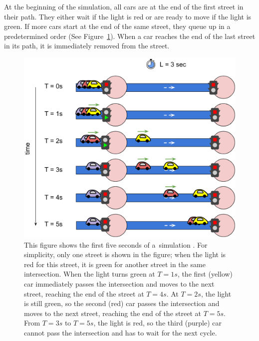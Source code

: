 At the beginning of the simulation, all cars are at the end of the first street in their path. They either wait if the light is red or are ready to move if the light is green. If more cars start at the end of the same street, they queue up in a predetermined order (See Figure~\ref{fig:hashcode_street}). When a car reaches the end of the last street in its path, it is immediately removed from the street.

\begin{figure}[ht] %
    \centering
    \includegraphics[width=\linewidth]{img/hashcode/figure3.png}
    \caption[Example of cars driving through a street]{
        This figure shows the first five seconds of a~simulation \cite{google_coding_competitions}.
        For simplicity, only one street is shown in the figure; when the light is red for this street, it is green for another street in the same intersection.
        When the light turns green at $T=1s$, the first (yellow) car immediately passes the intersection and moves to the next street, reaching the end of the street at $T=4s$.
        At $T=2s$, the light is still green, so the second (red) car passes the intersection and moves to the next street, reaching the end of the street at $T=5s$.
        From $T=3s$ to $T=5s$, the light is red, so the third (purple) car cannot pass the intersection and has to wait for the next cycle.
    }
    \label{fig:hashcode_street}
\end{figure}

